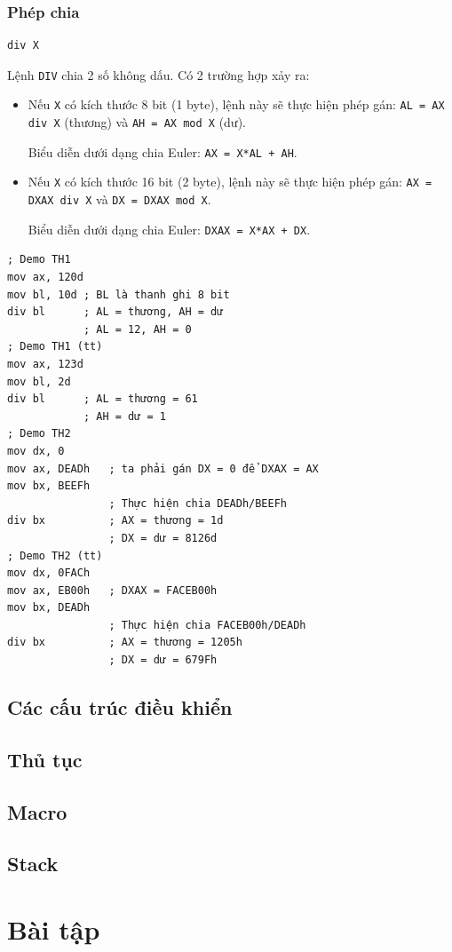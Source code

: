 \documentclass[12pt]{report}
\newcommand{\code}[1]{\texttt{#1}}
\begin{document}
\subsection{Phép chia}
\begin{verbatim}
div X
\end{verbatim}
Lệnh \code{DIV} chia 2 số không dấu.
Có 2 trường hợp xảy ra:
\begin{itemize}
    \item Nếu \code{X} có kích thước 8 bit (1 byte), lệnh này sẽ thực hiện phép gán: \code{AL = AX div X} (thương) và \code{AH = AX mod X} (dư).
    \par Biểu diễn dưới dạng chia Euler: \code{AX = X*AL + AH}.
    \item Nếu \code{X} có kích thước 16 bit (2 byte), lệnh này sẽ thực hiện phép gán: \code{AX = DXAX div X} và \code{DX = DXAX mod X}.
    \par Biểu diễn dưới dạng chia Euler: \code{DXAX = X*AX + DX}.
\end{itemize} 
\begin{verbatim}
; Demo TH1 
mov ax, 120d
mov bl, 10d ; BL là thanh ghi 8 bit 
div bl      ; AL = thương, AH = dư 
            ; AL = 12, AH = 0
; Demo TH1 (tt)
mov ax, 123d 
mov bl, 2d 
div bl      ; AL = thương = 61 
            ; AH = dư = 1
; Demo TH2 
mov dx, 0
mov ax, DEADh   ; ta phải gán DX = 0 để DXAX = AX 
mov bx, BEEFh 
                ; Thực hiện chia DEADh/BEEFh
div bx          ; AX = thương = 1d
                ; DX = dư = 8126d
; Demo TH2 (tt)
mov dx, 0FACh
mov ax, EB00h   ; DXAX = FACEB00h
mov bx, DEADh 
                ; Thực hiện chia FACEB00h/DEADh
div bx          ; AX = thương = 1205h
                ; DX = dư = 679Fh

\end{verbatim}

\section{Các cấu trúc điều khiển}


\section{Thủ tục}

\section{Macro}

\section{Stack}

\chapter{Bài tập}

\renewcommand{\bibname}{Tài liệu tham khảo}


\end{document}
